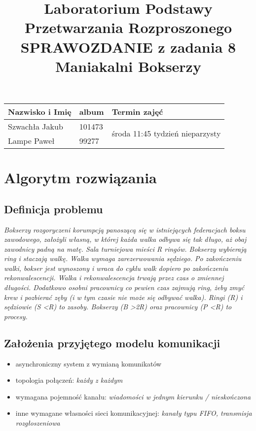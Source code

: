 \documentclass{article}
\title{\textbf{Laboratorium Podstawy Przetwarzania Rozproszonego \\ SPRAWOZDANIE z zadania 8 \\ Maniakalni Bokserzy}}
\author{}
\date{}
\begin{document}
\maketitle

\begin{center}
    \begin{tabular}{| l | l | l |}
    \hline
    \textbf{Nazwisko i Imię} & \textbf{album} & \textbf{Termin zajęć} \\ \hline
    Szwachła Jakub & 101473 & \multirow{2}{*}{środa 11:45 tydzień nieparzysty} \\
    Lampe Paweł & 99277 & \\
    \hline
    \end{tabular}
\end{center}

\section{Algorytm rozwiązania}
\subsection{Definicja problemu}
\emph{Bokserzy rozgoryczeni korumpcją panoszącą się w istniejących federacjach boksu zawodowego, założyli własną, w której każda walka odbywa się tak długo, aż obaj zawodnicy padną na matę. Sala turniejowa mieści R ringów. Bokserzy wybierają ring i staczają walkę. Walka wymaga zarezerwowania sędziego. Po zakończeniu walki, bokser jest wynoszony i wraca do cyklu walk dopiero po zakończeniu rekonwalescencji. Walka i rekonwalescencja trwają przez czas o zmiennej długości. Dodatkowo osobni pracownicy co pewien czas zajmują ring, żeby zmyć krew i pozbierać zęby (i w tym czasie nie może się odbywać walka). Ringi (R) i sędziowie (S \textless R) to zasoby. Bokserzy (B \textgreater 2R) oraz pracownicy (P \textless R) to procesy.}

\subsection{Założenia przyjętego modelu komunikacji}
\begin{itemize}
\item asynchroniczny system z wymianą komunikatów
\item topologia połączeń: \emph{każdy z każdym}
\item wymagana pojemność kanału:  \emph{wiadomości w jednym kierunku / nieskończona}
\item inne wymagane własności sieci komunikacyjnej: \emph{kanały typu FIFO, transmisja rozgłoszeniowa}
\end{itemize}
\end{document}
